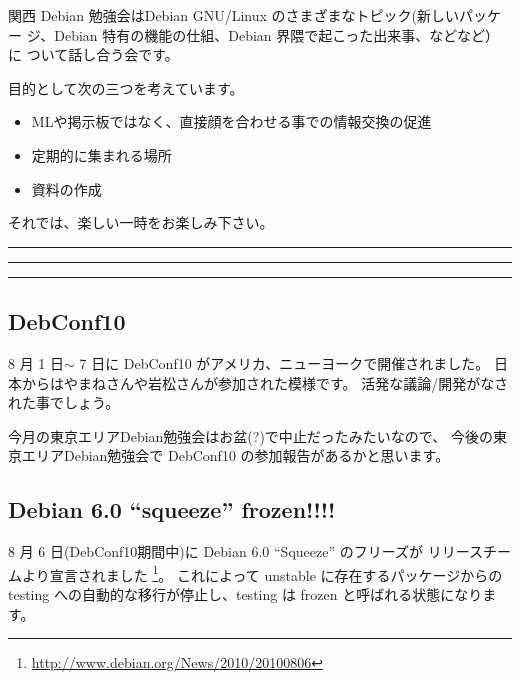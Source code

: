 \documentclass[mingoth,a4paper]{jsarticle}
\begin{document}
関西 Debian 勉強会はDebian GNU/Linux のさまざまなトピック(新しいパッケー
ジ、Debian 特有の機能の仕組、Debian 界隈で起こった出来事、などなど）に
ついて話し合う会です。

目的として次の三つを考えています。
\begin{itemize}
      \item MLや掲示板ではなく、直接顔を合わせる事での情報交換の促進
      \item 定期的に集まれる場所
      \item 資料の作成
\end{itemize}

それでは、楽しい一時をお楽しみ下さい。

\clearpage

\begin{minipage}[b]{0.2\hsize}
 {}
\end{minipage}
\begin{minipage}[b]{0.8\hsize}
\hrule
\vspace{2mm}
\hrule
\setcounter{tocdepth}{1}
\tableofcontents
\vspace{2mm}
\hrule
\end{minipage}


\subsection{DebConf10}

8 月 1 日$\sim$ 7 日に DebConf10 がアメリカ、ニューヨークで開催されました。
日本からはやまねさんや岩松さんが参加された模様です。
活発な議論/開発がなされた事でしょう。

今月の東京エリアDebian勉強会はお盆(?)で中止だったみたいなので、
今後の東京エリアDebian勉強会で DebConf10 の参加報告があるかと思います。

\subsection{Debian 6.0 ``squeeze'' frozen!!!!}

8 月 6 日(DebConf10期間中)に Debian 6.0 ``Squeeze'' のフリーズが
リリースチームより宣言されました%
\footnote{\url{http://www.debian.org/News/2010/20100806}}。
これによって unstable に存在するパッケージからの testing への自動的な移行が停止し、testing は frozen と呼ばれる状態になります。
\end{document}
